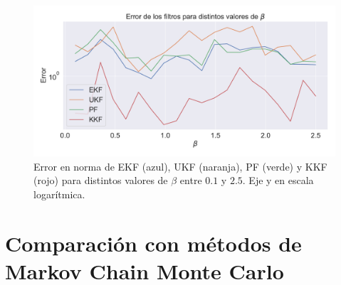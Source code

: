 \begin{figure}[h!]
    \centering
    \includegraphics[width=0.9\linewidth]{img/content/chapter4/nonlinear_filters_sir_error_beta.pdf}
    \caption{Error en norma de EKF (azul), UKF (naranja), PF (verde) y KKF (rojo) para distintos valores de $\beta$ entre $0.1$ y $2.5$. Eje y en escala logarítmica.}
    \label{fig:nonlinear_filters_sir_error_beta}
\end{figure}

\newpage

\section{Comparación con métodos de Markov Chain Monte Carlo}


